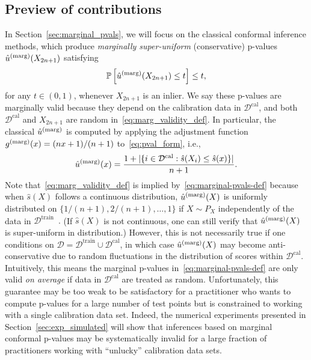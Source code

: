 \documentclass[11pt]{article}
\def\marg{\textnormal{(marg)}}
\begin{document}
\subsection{Preview of contributions}
\label{subsec:preview}


In Section~\ref{sec:marginal_pvals}, we will focus on the classical conformal inference methods, which produce \emph{marginally super-uniform} (conservative) p-values $\hat{u}^\marg(X_{2n+1})$ satisfying
\begin{equation}  \label{eq:marg_validity_def}
    \mathbb{P}\left[ \hat{u}^\marg(X_{2n+1}) \le t \right] \le t,
\end{equation}
for any $t \in (0,1)$, whenever $X_{2n+1}$ is an inlier.
We say these p-values are marginally valid because they depend on the calibration data in $\mathcal{D}^{\text{cal}}$, and both $\mathcal{D}^{\text{cal}}$ and $X_{2n+1}$ are random in~\eqref{eq:marg_validity_def}.
In particular, the classical $\hat{u}^\marg$ is computed by applying the adjustment function $g^\marg(x) =  (nx + 1) / (n + 1)$ to~\eqref{eq:pval_form}, i.e., 
\begin{equation} \label{eq:marginal-pvals-def}
    \hat{u}^\marg(x) = \frac{1 + |\{i \in \mathcal{D}^{\text{cal}} : \hat{s}(X_i) \le \hat{s}(x)\}|}{n+1}.
\end{equation}
Note that~\eqref{eq:marg_validity_def} {is implied by}~\eqref{eq:marginal-pvals-def} because {when $\hat{s}(X)$ follows a continuous distribution,} $\hat{u}^\marg(X)$ is uniformly distributed on $\{1/(n+1), 2/(n+1), \dots, 1\}$ if $X \sim P_X$ independently of the data in {$\mathcal{D}^{\text{train}}$~\cite{vovk1999machine, vovk2005algorithmic}.} (If $\hat{s}(X)$ is not continuous, one can still {verify} that $\hat{u}^\marg(X)$ is super-uniform in distribution.)
However, this is not necessarily true if one conditions on $\mathcal{D} = \mathcal{D}^{\text{train}} \cup \mathcal{D}^{\text{cal}}$, in which case $\hat{u}^\marg(X)$ may become anti-conservative due to random fluctuations in the distribution of scores within $\mathcal{D}^{\text{cal}}$.
Intuitively, this means the marginal p-values in~\eqref{eq:marginal-pvals-def} are only valid {\it on average} if data in $\mathcal{D}^{\text{cal}}$ are treated as random. Unfortunately, this guarantee may be too weak to be satisfactory for a practitioner who wants to compute p-values for a large number of test points but is constrained to working with a single calibration data set. Indeed, the numerical experiments presented in Section~\ref{sec:exp_simulated} will show that inferences based on marginal conformal p-values may be systematically invalid for a large fraction of practitioners working with ``unlucky'' calibration data sets.
\end{document}
